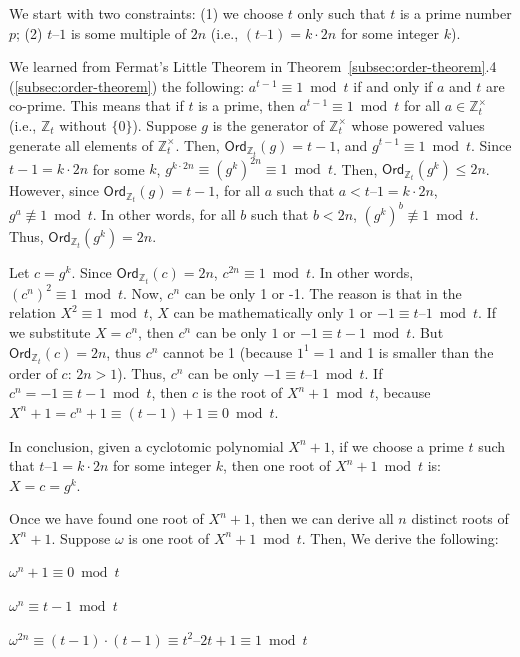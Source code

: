 We start with two constraints: (1) we choose $t$ only such that $t$ is a prime number $p$; (2) $t – 1$ is some multiple of $2n$ (i.e., $(t – 1) = k \cdot 2n$ for some integer $k$). 

We learned from Fermat's Little Theorem in Theorem~\ref*{subsec:order-theorem}.4 (\autoref{subsec:order-theorem}) the following: $a^{t - 1} \equiv 1 \bmod t$ if and only if $a$ and $t$ are co-prime. This means that if $t$ is a prime, then $a^{t - 1} \equiv 1 \bmod t$ for all $a \in \mathbb{Z}_t^{\times}$ (i.e., $\mathbb{Z}_t$ without $\{0\}$). Suppose $g$ is the generator of $\mathbb{Z}_t^{\times}$ whose powered values generate all elements of $\mathbb{Z}_t^{\times}$. Then, $\textsf{Ord}_{\mathbb{Z}_t}(g) = t - 1$, and $g^{t - 1} \equiv 1 \bmod t$. Since $t - 1 = k \cdot 2n$ for some $k$, $g^{k\cdot2n} \equiv (g^{k})^{2n} \equiv 1 \bmod t$. Then, $\textsf{Ord}_{\mathbb{Z}_t}(g^{k}) \leq 2n$. However, since $\textsf{Ord}_{\mathbb{Z}_t}(g) = t - 1$, for all $a$ such that $a < t – 1 = k \cdot 2n$, $g^a \not\equiv 1 \bmod t$. In other words, for all $b$ such that $b < 2n$, $(g^k)^b \not\equiv 1 \bmod t$. Thus, $\textsf{Ord}_{\mathbb{Z}_t}(g^{k}) = 2n$. 

Let $c = g^k$. Since $\textsf{Ord}_{\mathbb{Z}_t}(c) = 2n$, $c^{2n} \equiv 1 \bmod t$. In other words, $(c^n)^2 \equiv 1 \bmod t$. 
Now, $c^n$ can be only 1 or -1. The reason is that in the relation $X^2 \equiv 1 \bmod t$, $X$ can be mathematically only $1$ or $-1 \equiv t – 1 \bmod t$. If we substitute $X = c^n$, then $c^n$ can be only $1$ or $-1 \equiv t - 1 \bmod t$. But $\textsf{Ord}_{\mathbb{Z}_t}(c) = 2n$, thus $c^n$ cannot be 1 (because $1^1 = 1$ and 1 is smaller than the order of $c$: $2n > 1$). Thus, $c^n$ can be only $-1 \equiv t – 1 \bmod t$. If $c^n = -1 \equiv t - 1 \bmod t$, then $c$ is the root of $X^n + 1 \bmod t$, because $X^n + 1 = c^n + 1 \equiv (t - 1) + 1 \equiv 0 \bmod t$. 

In conclusion, given a cyclotomic polynomial $X^n + 1$, if we choose a prime $t$ such that $t – 1 = k \cdot 2n$ for some integer $k$, then one root of $X^n + 1 \bmod t$ is: $X = c = g^k$. 

Once we have found one root of $X^n + 1$, then we can derive all $n$ distinct roots of $X^n + 1$. Suppose $\omega$ is one root of $X^n + 1 \bmod t$. Then, We derive the following:

$\omega^n + 1 \equiv 0 \bmod t$

$\omega^n \equiv t - 1 \bmod t$

$\omega^{2n} \equiv (t - 1)\cdot(t - 1) \equiv  t^2 – 2t + 1 \equiv   1 \bmod t$

